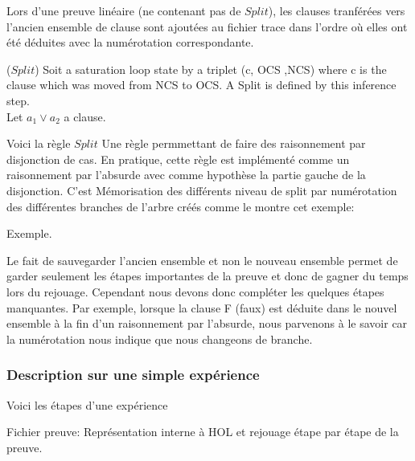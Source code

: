 Lors d'une preuve linéaire (ne contenant pas de $Split$), les clauses tranférées vers l'ancien ensemble de clause sont ajoutées au fichier trace dans l'ordre où elles ont été déduites avec la numérotation correspondante.

\begin{mydef} ($Split$)
Soit a saturation loop state by a triplet (c, OCS ,NCS) where c is the clause which was moved from NCS to OCS. 
A Split is defined by this inference step. 
\\Let $a_1 \vee a_2$ a clause.
\end{mydef}

\begin{prooftree}
\end{prooftree}  
   

Voici la règle $Split$
Une règle permmettant de faire des raisonnement par disjonction de cas.
En pratique, cette règle est implémenté comme un raisonnement par l'absurde avec comme hypothèse la partie gauche de la disjonction. C'est 
Mémorisation des différents niveau de split par numérotation des différentes branches de l'arbre créés comme le montre cet exemple:

Exemple.

Le fait de sauvegarder l'ancien ensemble et non le nouveau ensemble permet de garder seulement les étapes importantes de la preuve et donc de gagner du temps lors du rejouage. Cependant nous devons donc compléter les quelques étapes manquantes. Par exemple, lorsque la clause F (faux) est déduite dans le nouvel ensemble à la fin d'un raisonnement par l'absurde, nous parvenons à le savoir car la numérotation nous indique que nous changeons de branche.  

\subsubsection{Description sur une simple expérience}
 Voici les étapes d'une expérience
 
 Fichier preuve:
 Représentation interne à HOL et rejouage étape par étape de la preuve.
 
 


